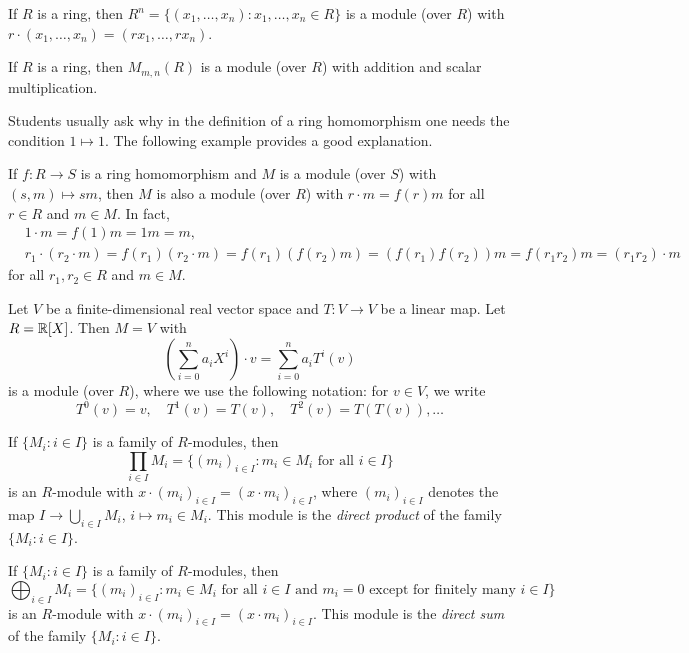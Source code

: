 \begin{example}
If $R$ is a ring, then $R^n=\{(x_1,\dots,x_n):x_1,\dots,x_n\in R\}$ 
is a module (over $R$) with  
$r\cdot (x_1,\dots,x_n)=(rx_1,\dots,rx_n)$. 
\end{example}

\begin{example}
If $R$ is a ring, then $M_{m,n}(R)$ is a module (over $R$) with addition
and scalar multiplication. 
\end{example}

Students usually ask why in the definition of a ring homomorphism one needs
the condition $1\mapsto 1$. The following example provides a good explanation. 

\begin{example}
If $f\colon R\to S$ is a ring homomorphism and $M$ is a module (over $S$) with 
$(s,m)\mapsto sm$, then 
$M$ is also a module (over $R$) with $r\cdot m=f(r)m$ for all $r\in R$ and
$m\in M$. In fact, 
\begin{align*}
&1\cdot m=f(1)m=1m=m,\\
&r_1\cdot (r_2\cdot m)=f(r_1)(r_2\cdot m)=f(r_1)(f(r_2)m)=(f(r_1)f(r_2))m=f(r_1r_2)m=(r_1r_2)\cdot m
\end{align*}
for all $r_1,r_2\in R$ and $m\in M$.	  	
\end{example}
%
\begin{example}
\label{exa:RX-module}
Let $V$ be a finite-dimensional real vector space and $T\colon V\to V$ be a
linear map.  Let $R=\mathbb{R}[X]$. Then $M=V$ with 
\[
\left(\sum_{i=0}^na_iX^i\right)\cdot v=\sum_{i=0}^na_iT^i(v)
\]	
is a module (over $R$), where we use the following notation: for $v\in V$, we write 
\[
    T^0(v)=v,\quad 
    T^1(v)=T(v),\quad 
    T^2(v)=T(T(v)),\dots 
\]
\end{example}

\begin{example}
If $\{M_i:i\in I\}$ is a family of $R$-modules, then  	
\[
\prod_{i\in I}M_i=\{(m_i)_{i\in I}:m_i\in M_i\text{ for all $i\in I$}\}
\]
is an $R$-module with 
$x\cdot (m_i)_{i\in I}=(x\cdot m_i)_{i\in I}$, 
where $(m_i)_{i\in I}$ denotes the map $I\to \bigcup_{i\in I}M_i$, $i\mapsto m_i\in M_i$.
This module is the \emph{direct product} of the family $\{M_i:i\in I\}$.
\end{example}

\begin{example}
If $\{M_i:i\in I\}$ is a family of $R$-modules, then   	
\[
\bigoplus_{i\in I}M_i=\{(m_i)_{i\in I}:m_i\in M_i\text{ for all $i\in I$ and $m_i=0$ except for finitely many $i\in I$}\}
\]
is an $R$-module with 
$x\cdot (m_i)_{i\in I}=(x\cdot m_i)_{i\in I}$. 
This module is the \emph{direct sum} of the family $\{M_i:i\in I\}$. 
\end{example}

